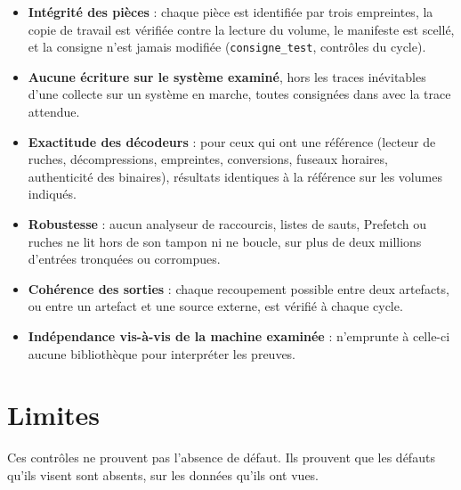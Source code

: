 \documentclass[11pt,a4paper,oneside]{report}
\begin{document}
\begin{itemize}
  \item \textbf{Intégrité des pièces} : chaque pièce est identifiée par trois
    empreintes, la copie de travail est vérifiée contre la lecture du volume,
    le manifeste est scellé, et la consigne n'est jamais modifiée
    (\texttt{consigne\_test}, contrôles du cycle).
  \item \textbf{Aucune écriture sur le système examiné}, hors les traces
    inévitables d'une collecte sur un système en marche, toutes consignées dans
     avec la trace attendue.
  \item \textbf{Exactitude des décodeurs} : pour ceux qui ont une référence
    (lecteur de ruches, décompressions, empreintes, conversions, fuseaux
    horaires, authenticité des binaires), résultats identiques à la référence
    sur les volumes indiqués.
  \item \textbf{Robustesse} : aucun analyseur de raccourcis, listes de sauts,
    Prefetch ou ruches ne lit hors de son tampon ni ne boucle, sur plus de deux
    millions d'entrées tronquées ou corrompues.
  \item \textbf{Cohérence des sorties} : chaque recoupement possible entre deux
    artefacts, ou entre un artefact et une source externe, est vérifié à chaque
    cycle.
  \item \textbf{Indépendance vis-à-vis de la machine examinée} : \wac{}
    n'emprunte à celle-ci aucune bibliothèque pour interpréter les preuves.
\end{itemize}

\section{Limites}

\begin{attention}
Ces contrôles ne prouvent pas l'absence de défaut. Ils prouvent que les défauts
qu'ils visent sont absents, sur les données qu'ils ont vues.
\end{attention}
\end{document}
